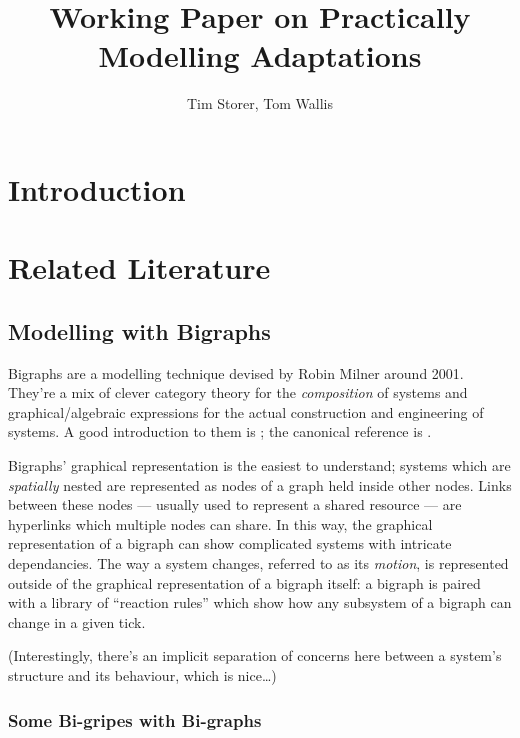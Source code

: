 \documentclass{article}
\title{Working Paper on Practically Modelling Adaptations}
\author{Tim Storer, Tom Wallis}
\begin{document}
\section{Introduction}

\section{Related Literature}

\subsection{Modelling with Bigraphs}

Bigraphs are a modelling technique devised by Robin Milner around 2001. They're
a mix of clever category theory for the \emph{composition} of systems and
graphical/algebraic expressions for the actual construction and engineering of
systems. A good introduction to them is \cite{milner:bigraphsandtheiralgebra};
the canonical reference is \cite{milner:spaceandmotion}.

Bigraphs' graphical representation is the easiest to understand; systems which
are \emph{spatially} nested are represented as nodes of a graph held inside
other nodes. Links between these nodes --- usually used to represent a shared
resource --- are hyperlinks which multiple nodes can share. In this way, the
graphical representation of a bigraph can show complicated systems with
intricate dependancies. The way a system changes, referred to as its
\emph{motion}, is represented outside of the graphical representation of a
bigraph itself: a bigraph is paired with a library of ``reaction rules'' which
show how any subsystem of a bigraph can change in a given tick.

(Interestingly, there's an implicit separation of concerns here between a
system's structure and its behaviour, which is nice\ldots{})

\subsubsection{Some Bi-gripes with Bi-graphs}



\end{document}
